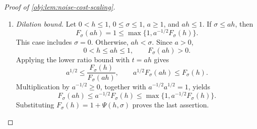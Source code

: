 \begin{proof}[Proof of \cref{obj:lem:noise-cost-scaling}]
\begin{enumerate}
\item \emph{Dilation bound.}
Let \(0<h\le1\), \(0\le\sigma\le1\), \(a\ge1\), and \(ah\le1\). If \(\sigma\le ah\), then
\[
F_\sigma(ah)=1
\le\max\{1,a^{-1/2}F_\sigma(h)\}.
\]
This case includes \(\sigma=0\). Otherwise, \(ah<\sigma\). Since \(a>0\),
\[
0<h\le ah\le1,\qquad F_\sigma(ah)>0.
\]
Applying the lower ratio bound with \(t=ah\) gives
\[
a^{1/2}
\le\frac{F_\sigma(h)}{F_\sigma(ah)},
\qquad
a^{1/2}F_\sigma(ah)\le F_\sigma(h).
\]
Multiplication by \(a^{-1/2}\ge0\), together with
\(a^{-1/2}a^{1/2}=1\), yields
\[
F_\sigma(ah)
\le a^{-1/2}F_\sigma(h)
\le\max\{1,a^{-1/2}F_\sigma(h)\}.
\]
Substituting \(F_\sigma(h)=1+\Psi(h,\sigma)\) proves the last assertion.
\end{enumerate}
\end{proof}
